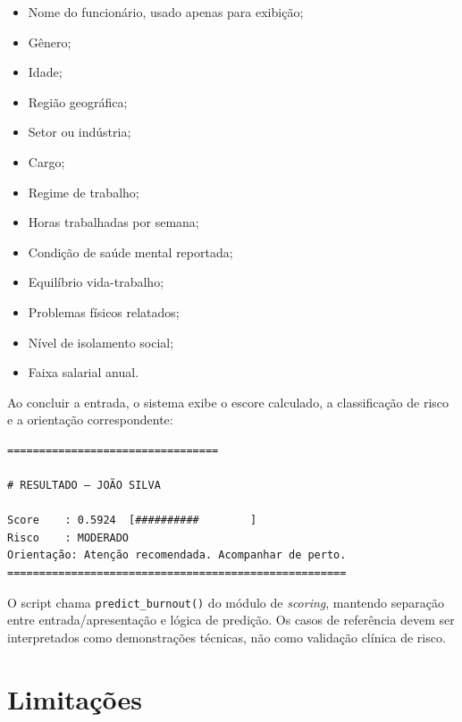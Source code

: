\documentclass[conference]{IEEEtran}
\begin{document}
\begin{itemize}
\item Nome do funcionário, usado apenas para exibição;
\item Gênero;
\item Idade;
\item Região geográfica;
\item Setor ou indústria;
\item Cargo;
\item Regime de trabalho;
\item Horas trabalhadas por semana;
\item Condição de saúde mental reportada;
\item Equilíbrio vida-trabalho;
\item Problemas físicos relatados;
\item Nível de isolamento social;
\item Faixa salarial anual.
\end{itemize}

Ao concluir a entrada, o sistema exibe o escore calculado, a classificação
de risco e a orientação correspondente:

\begin{lstlisting}[caption={Exemplo de saída do \texttt{prever.py}
para um caso de risco moderado.}]
=================================

# RESULTADO — JOÃO SILVA

Score    : 0.5924  [##########        ]
Risco    : MODERADO
Orientação: Atenção recomendada. Acompanhar de perto.
=====================================================

\end{lstlisting}

O script chama \texttt{predict_burnout()} do módulo de \textit{scoring},
mantendo separação entre entrada/apresentação e lógica de predição. Os
casos de referência devem ser interpretados como demonstrações técnicas,
não como validação clínica de risco.

\section{Limitações}
\label{sec:limit}
\end{document}
